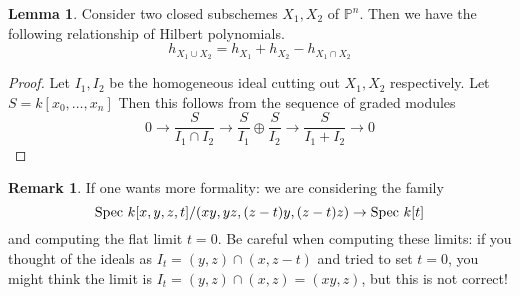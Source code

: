 \documentclass[10pt,reqno]{amsart}
\theoremstyle{definition}
\newtheorem{lemma}[theorem]{Lemma}
\newtheorem{remark}[theorem]{Remark}
\theoremstyle{remark}
\numberwithin{equation}{section}
\numberwithin{theorem}{section}
\newcommand{\spec}{\textup{Spec }}
\newcommand{\PP}{{\mathbb P}}
\begin{document}
\begin{lemma} Consider two closed subschemes $X_1,X_2$ of $\PP^n$. Then we have the following relationship of Hilbert polynomials.
\[h_{X_1 \cup X_2} = h_{X_1} + h_{X_2} - h_{X_1 \cap X_2} \]
\end{lemma}
\begin{proof}
Let $I_1, I_2$ be the homogeneous ideal cutting out $X_1,X_2$ respectively. Let $S = k[x_0,\dots,x_n]$ Then this follows from the sequence of graded modules
\[0 \to \frac{S}{I_1 \cap I_2} \to \frac{S}{I_1} \oplus \frac{S}{I_2} \to \frac{S}{I_1 + I_2} \to 0\]
\end{proof}



\begin{remark} If one wants more formality: we are considering the family 
\[\spec k[x,y,z,t]/(xy,yz,(z-t)y,(z-t)z) \to \spec k[t] \]
 and computing the flat limit $t=0$. Be careful when computing these limits: if you thought of the ideals as $I_t = (y,z) \cap (x,z-t)$ and tried to set $t=0$, you might think the limit is $I_t = (y,z) \cap (x,z) = (xy,z)$, but this is not correct!
\end{remark}
\end{document}
